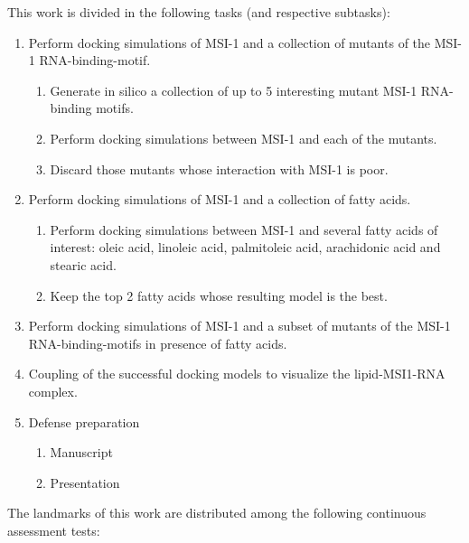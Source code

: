 This work is divided in the following tasks (and respective subtasks):

\begin{enumerate}
    \item Perform docking simulations of MSI-1 and a collection of mutants of the MSI-1 RNA-binding-motif.
        \begin{enumerate}
            \item Generate in silico a collection of up to 5 interesting mutant MSI-1 RNA-binding motifs.
            \item Perform docking simulations between MSI-1 and each of the mutants.
            \item Discard those mutants whose interaction with MSI-1 is poor.
        \end{enumerate}
    \item Perform docking simulations of MSI-1 and a collection of fatty acids.
        \begin{enumerate}
            \item Perform docking simulations between MSI-1 and several fatty acids of interest: oleic acid, linoleic acid, palmitoleic acid, arachidonic acid and stearic acid.
            \item Keep the top 2 fatty acids whose resulting model is the best.
        \end{enumerate}
    \item Perform docking simulations of MSI-1 and a subset of mutants of the MSI-1 RNA-binding-motifs in presence of fatty acids.
    \item Coupling of the successful docking models to visualize the lipid-MSI1-RNA complex.
    \pagebreak
    \item Defense preparation
        \begin{enumerate}
            \item Manuscript
            \item Presentation
        \end{enumerate}
\end{enumerate}

The landmarks of this work are distributed among the following continuous assessment tests:

